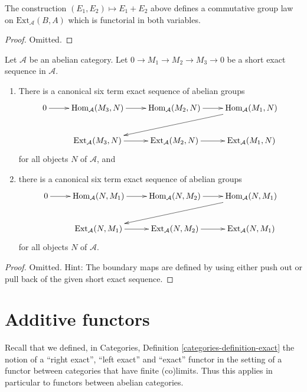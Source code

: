 \begin{lemma}
\label{lemma-baer-sum}
The construction $(E_1, E_2) \mapsto E_1 + E_2$
above defines a commutative group
law on $\text{Ext}_\mathcal{A}(B, A)$ which is
functorial in both variables.
\end{lemma}

\begin{proof}
Omitted.
\end{proof}

\begin{lemma}
\label{lemma-six-term-sequence-ext}
Let $\mathcal{A}$ be an abelian category.
Let $0 \to M_1 \to M_2 \to M_3 \to 0$ be a short exact sequence
in $\mathcal{A}$.
\begin{enumerate}
\item There is a canonical six term exact sequence of abelian groups
$$
\xymatrix{
0 \ar[r] &
\Hom_\mathcal{A}(M_3, N) \ar[r] &
\Hom_\mathcal{A}(M_2, N) \ar[r] &
\Hom_\mathcal{A}(M_1, N) \ar[lld] \\
& \text{Ext}_\mathcal{A}(M_3, N) \ar[r] &
\text{Ext}_\mathcal{A}(M_2, N) \ar[r] &
\text{Ext}_\mathcal{A}(M_1, N)
}
$$
for all objects $N$ of $\mathcal{A}$, and
\item there is a canonical six term exact sequence of abelian groups
$$
\xymatrix{
0 \ar[r] &
\Hom_\mathcal{A}(N, M_1) \ar[r] &
\Hom_\mathcal{A}(N, M_2) \ar[r] &
\Hom_\mathcal{A}(N, M_1) \ar[lld] \\
& \text{Ext}_\mathcal{A}(N, M_1) \ar[r] &
\text{Ext}_\mathcal{A}(N, M_2) \ar[r] &
\text{Ext}_\mathcal{A}(N, M_1)
}
$$
for all objects $N$ of $\mathcal{A}$.
\end{enumerate}
\end{lemma}

\begin{proof}
Omitted. Hint: The boundary maps are defined by using either push out
or pull back of the given short exact sequence.
\end{proof}






\section{Additive functors}
\label{section-functors}

\noindent
Recall that we defined, in
Categories, Definition \ref{categories-definition-exact}
the notion of a ``right exact'', ``left exact'' and
``exact'' functor in the setting of a functor between
categories that have finite (co)limits. Thus this
applies in particular to functors between abelian
categories.

